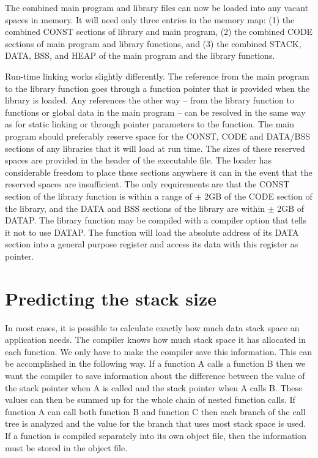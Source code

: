 \documentclass[forwardcom.tex]{subfiles}
\begin{document}
The combined main program and library files can now be loaded into any vacant spaces in memory. It will need only three entries in the memory map: (1) the combined CONST sections of library and main program, (2) the combined CODE sections of main program and library functions, and (3) the combined STACK, DATA, BSS, and HEAP of the main program and the library functions. 
\vv

Run-time linking works slightly differently. The reference from the main program to the library function goes through a function pointer that is provided when the library is loaded. Any references the other way -- from the library function to functions or global data in the main 
program -- can be resolved in the same way as for static linking or through pointer parameters to the function. The main program should preferably reserve space for the CONST, CODE and DATA/BSS sections of any libraries that it will load at run time. The sizes of these reserved spaces are provided in the header of the executable file. The loader has considerable freedom to place these sections anywhere it can in the event that the reserved spaces are insufficient. The only requirements are that the CONST section of the library function is within a range of $\pm$ 2GB of the CODE section of the library, and the DATA and BSS sections of the library are within $\pm$ 2GB of DATAP. The library function may be compiled with a compiler option that tells it not to use DATAP. The function will load the absolute address of its DATA section into a general purpose register and access its data with this register as pointer. 
\vv

\section{Predicting the stack size} \label{predictingStackSize}
In most cases, it is possible to calculate exactly how much data stack space an application needs. The compiler knows how much stack space it has allocated in each function. We only have to make the compiler save this information. This can be accomplished in the following way. If a function A calls a function B then we want the compiler to save information about the difference between the value of the stack pointer when A is called and the stack pointer when A calls B. These values can then be summed up for the whole chain of nested function calls. If function A can call both function B and function C then each branch of the call tree is analyzed and the value for the branch that uses most stack space is used. If a function is compiled separately into its own object file, then the information must be stored in the object file. 
\vv
\end{document}
